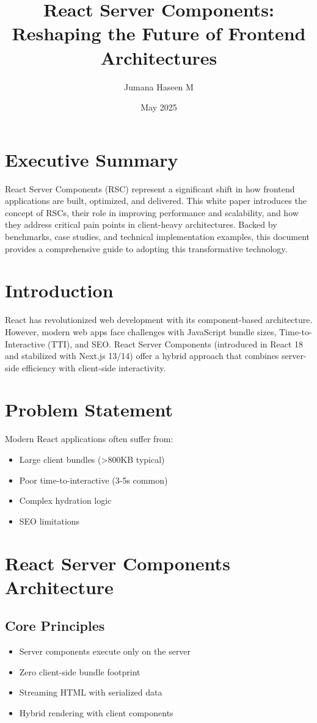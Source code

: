 \documentclass[12pt]{article}
\title{\textbf{React Server Components: Reshaping the Future of Frontend Architectures}}
\author{Jumana Haseen M}
\date{May 2025}
\begin{document}
\maketitle

\section*{Executive Summary}
React Server Components (RSC) represent a significant shift in how frontend applications are built, optimized, and delivered. This white paper introduces the concept of RSCs, their role in improving performance and scalability, and how they address critical pain points in client-heavy architectures. Backed by benchmarks, case studies, and technical implementation examples, this document provides a comprehensive guide to adopting this transformative technology.

\section{Introduction}
React has revolutionized web development with its component-based architecture. However, modern web apps face challenges with JavaScript bundle sizes, Time-to-Interactive (TTI), and SEO. React Server Components (introduced in React 18 and stabilized with Next.js 13/14) offer a hybrid approach that combines server-side efficiency with client-side interactivity.

\section{Problem Statement}
Modern React applications often suffer from:
\begin{itemize}
    \item Large client bundles (>800KB typical)
    \item Poor time-to-interactive (3-5s common)
    \item Complex hydration logic
    \item SEO limitations
\end{itemize}

\section{React Server Components Architecture}
\subsection*{Core Principles}
\begin{itemize}
    \item Server components execute only on the server
    \item Zero client-side bundle footprint
    \item Streaming HTML with serialized data
    \item Hybrid rendering with client components
\end{itemize}
\end{document}
